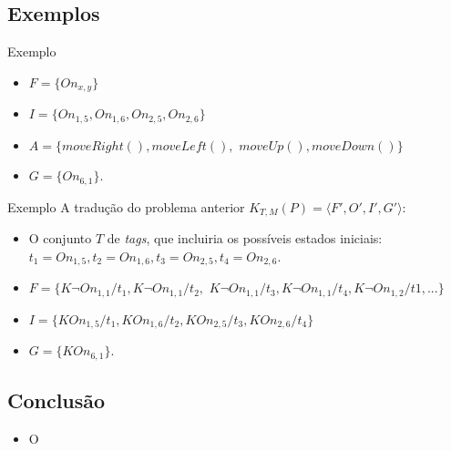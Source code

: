 \subsection{Exemplos}
\begin{frame}{Exemplo}
    \begin{multicols}{2}
        \centering
        
    \columnbreak
        \begin{itemize}
        \item $F = \lbrace On_{x,y} \rbrace$
        \item $I=\lbrace On_{1,5}, On_{1,6}, On_{2,5}, On_{2,6} \rbrace$
        \item $A=\lbrace moveRight(), moveLeft(),$ $moveUp(), moveDown() 
\rbrace$
        \item $G=\lbrace On_{6,1}\rbrace$.
        \end{itemize} 
    \end{multicols}
\end{frame}

\begin{frame}{Exemplo}
    A tradução do problema anterior $K_{T,M}(P) = \langle F', O', I', 
G'\rangle$:
    \begin{itemize}
    \item O conjunto $T$ de \textit{tags}, que incluiria os possíveis estados 
iniciais: 
    $t_1 = On_{1,5}, t_2 = On_{1,6}, t_3 = On_{2,5}, t_4 = On_{2,6}$.
    \item $F = \lbrace  K \lnot On_{1,1} / t_1, K \lnot On_{1,1} / t_2,$ 
    $ K \lnot On_{1,1} / t_3, K \lnot On_{1,1} / t_4, K \lnot On_{1,2} / t1,... 
\rbrace$
    \item $I=\lbrace K On_{1,5}/t_1, K On_{1,6}/t_2, K On_{2,5}/ t_3, K 
On_{2,6}/ t_4 \rbrace$
    \item $G=\lbrace K On_{6,1}\rbrace$.
    \end{itemize}
\end{frame}


\subsection{Conclusão}
\begin{frame}
    \begin{itemize}
        \item O 
    \end{itemize}
\end{frame} 
